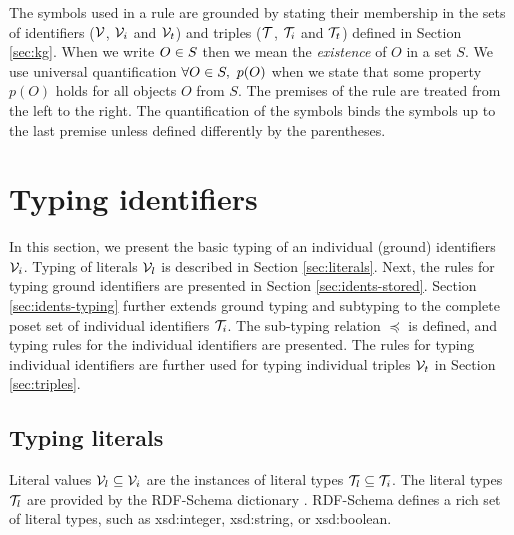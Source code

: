 \documentclass[runningheads]{llncs}
\newcommand{\V}{{\cal V}}
\newcommand{\T}{{\cal T}}
\newcommand{\memo}[1]{}
\begin{document}
The symbols used in a rule are grounded by stating their membership in
the sets of identifiers ($\V$, $\V_i$ and $\V_t$) and triples ($\T$,
$\T_i$ and $\T_t$) defined in Section \ref{sec:kg}. When we write
$O\in\/S$ then we mean the \emph{existence} of $O$ in a set $S$. We
use universal quantification $\forall\/O\in\/S,\ p(O)$ when we state
that some property $p(O)$ holds for all objects $O$ from $S$. The
premises of the rule are treated from the left to the right. The
quantification of the symbols binds the symbols up to the last premise
unless defined differently by the parentheses.

\memo{
Similar to \cite{Dunfield2021}, we differ between two interpretations
of rules. First, the \emph{generator} view of rules is the forward
interpretation where rules infer the types from the types derived by
premises. Second, the \emph{type-checking} view of the rules is the
backward interpretation. Given the expression and its type, the rules
are applied backwards to verify that the expression has that type.}






\section{Typing identifiers\label{sec:typ-idents}}

In this section, we present the basic typing of an individual (ground)
identifiers $\V_i$. Typing of literals $\V_l$ is described in Section
\ref{sec:literals}. Next, the rules for typing ground identifiers are
presented in Section \ref{sec:idents-stored}. Section
\ref{sec:idents-typing} further extends ground typing and subtyping to
the complete poset set of individual identifiers $\T_i$. The
sub-typing relation $\preceq$ is defined, and typing rules for the
individual identifiers are presented. The rules for typing individual
identifiers are further used for typing individual triples $\V_t$ in
Section \ref{sec:triples}.





\subsection{Typing literals\label{sec:literals}}

Literal values $\V_l\subseteq\V_i$ are the instances of literal types
$\T_l\subseteq\T_i$. The literal types $\T_l$ are provided by the
RDF-Schema dictionary \cite{rdfschema}. RDF-Schema defines a rich set
of literal types, such as xsd:integer, xsd:string, or xsd:boolean.
\end{document}
